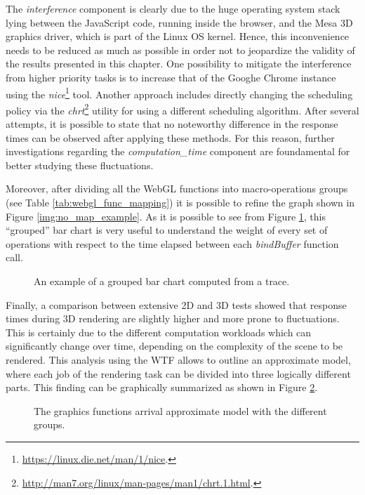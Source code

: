 The \emph{interference} component is clearly due to the huge operating system
stack lying between the JavaScript code, running inside the
browser, and the Mesa 3D graphics driver, which is part of the Linux OS kernel.
Hence, this inconvenience needs to be reduced as much as possible in order not
to jeopardize the validity of the results presented in this chapter.
One possibility to mitigate
the interference from higher priority tasks is to increase that of
the Googhe Chrome instance using the \emph{nice}\footnote{\url{https://linux.die.net/man/1/nice}.}
tool. Another approach includes directly changing the scheduling policy via the
\emph{chrt}\footnote{\url{http://man7.org/linux/man-pages/man1/chrt.1.html}.}
utility for using a different scheduling algorithm. After several attempts,
it is possible to state that no
noteworthy difference in the response times can be observed after applying these
methods. For this reason, further investigations regarding the \emph{computation\_time}
component are foundamental for better studying these fluctuations.

Moreover, after dividing all the WebGL functions into macro-operations groups
(see Table \ref{tab:webgl_func_mapping}) it is possible to refine the graph shown
in Figure \ref{img:no_map_example}. As it is possible to see from Figure
\ref{img:no_map_groups}, this ``grouped'' bar chart is very useful to understand
the weight of every set of operations with respect to the time elapsed between
each \emph{bindBuffer} function call.
\begin{figure}[!htb]
    \caption{An example of a grouped bar chart computed from a trace.}
    \label{img:no_map_groups}
\end{figure}

Finally, a comparison between extensive 2D and 3D tests showed that response times
during 3D rendering are slightly higher and more prone to fluctuations. This is
certainly due to the different computation workloads which can significantly change
over time, depending on the complexity of the scene to be rendered.
This analysis using the WTF allows to outline an approximate model, where
each job of the rendering task can be divided into three logically different
parts. This finding can be graphically summarized as shown in Figure \ref{img:call_arrival}.
\begin{figure}[!htb]
    \caption{The graphics functions arrival approximate model with the different groups.}
    \label{img:call_arrival}
\end{figure}


